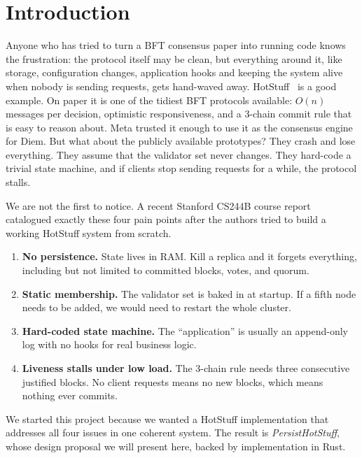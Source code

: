 \documentclass{SVProc}
\begin{document}
\section{Introduction}
\label{sec:introduction}

Anyone who has tried to turn a BFT consensus paper into running code knows the frustration: the protocol itself may be clean, but everything around it, like storage, configuration changes, application hooks and keeping the system alive when nobody is sending requests, gets hand-waved away. HotStuff~\cite{hotstuff2019} is a good example. On paper it is one of the tidiest BFT protocols available: $O(n)$ messages per decision, optimistic responsiveness, and a 3-chain commit rule that is easy to reason about. Meta trusted it enough to use it as the consensus engine for Diem. But what about the publicly available prototypes? They crash and lose everything. They assume that the validator set never changes. They hard-code
a trivial state machine, and if clients stop sending requests for a while, the protocol stalls.

We are not the first to notice.  A recent Stanford CS244B course
report~\cite{stanford_hotstuff2024} catalogued exactly these four pain points after the authors tried to build a working HotStuff system from scratch.

\begin{enumerate}
  \item[1.] \textbf{No persistence.}  State lives in RAM.  Kill a
    replica and it forgets everything, including but not limited to committed blocks, votes, and quorum. 
  \item[2.] \textbf{Static membership.}  The validator set is baked in at startup. If a fifth node needs to be added, we would need to restart the whole cluster.
  \item[3.] \textbf{Hard-coded state machine.}  The ``application'' is usually an append-only log with no hooks for real business logic.
  \item[4.] \textbf{Liveness stalls under low load.}  The 3-chain
    rule needs three consecutive justified blocks.  No client requests means no new blocks, which means nothing ever commits.
\end{enumerate}

We started this project because we wanted a HotStuff implementation
that addresses all four issues in one coherent system. The result is \textit{PersistHotStuff}, whose design proposal we will present here, backed by implementation in Rust\cite{rust-implementation}.
\end{document}
